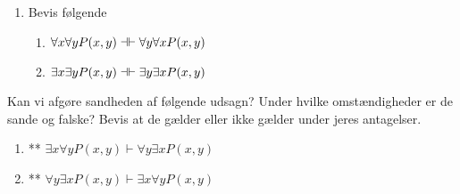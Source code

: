 \begin{opg}
\begin{enumerate}
\begin{solution}
\begin{proofbox}
			\[
				\lbl{forall_is_false}
				\: \neg \forall x \, \neg \phi \= \text{antagelse (for $\imp$i)} \\
				\lbl{pbc_box}
				\[
					\lbl{is_false}
					\: \neg \exists x \, \phi \= \text{antagelse (for PBC)} \\
					\lbl{forall_box}
					\[
						x_0 \: \= \text{lad $x_0$ være givet (for $\forall x$ i)} \\
						\lbl{neg_box}
						\[
							\lbl{phi_true}
							\: \phi[x_0/x] \= \text{antagelse (for $\neg$i)} \\
							\lbl{is_true}
							\: \exists x \, \phi \= \exists x\text{ i } \ref{phi_true} \\
							\label{_pr_exc1_neg_box2a_end}
							\: \bot \= \neg\text{e } \ref{is_true},\ref{is_false}
						\]
						\label{_pr_exc1_forall_box2a_end}
						\: \neg \phi[x_0/x] \=  \ref{neg_box}-\ref{_pr_exc1_neg_box2a_end}
					\]
					\: \forall x \, \neg \phi \= \forall x  \ref{forall_box}-\ref{_pr_exc1_forall_box2a_end} \\
					\label{_pr_exc1_pbc_box2a_end}
					\: \bot \=  \ref{forall_is_true},\ref{forall_is_false}
				\]
				\label{_pr_exc1_imp_box2a_end}
				\: \exists x \, \phi \=  \ref{pbc_box}-\ref{_pr_exc1_pbc_box2a_end}
			\]
			\: \neg \forall x \, \neg \phi \imp \exists x \, \phi \=  \ref{imp_box2}-\ref{_pr_exc1_imp_box2a_end} \\
			\: \exists x \, \phi \bimp \neg \forall x \, \neg \phi \=  \ref{imp1},\ref{imp2}
		\end{proofbox}
	\end{solution}
	\item{Bevis følgende}
	\begin{enumerate}
		\item $\forall x \forall y P(x,y) \dashv\vdash \forall y \forall x P(x,y)$
		\item $\exists x \exists y P(x,y) \dashv\vdash \exists y \exists x P(x,y)$
	\end{enumerate}
\end{enumerate}
\end{opg}

\begin{opg}
	Kan vi afgøre sandheden af følgende udsagn? Under hvilke omstændigheder er de sande og falske? Bevis at de gælder eller ikke gælder under jeres antagelser.
	\begin{enumerate}
		\item ** $\exists x \forall y P(x,y) \vdash \forall y \exists x P(x,y)$
		\item ** $\forall y \exists x P(x,y) \vdash \exists x \forall y P(x,y)$
	\end{enumerate}
\end{opg}

\ifdefined\startOpgaverPraedikatlogik\fi
